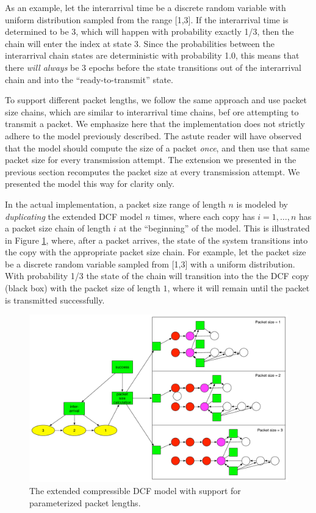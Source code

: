 \documentclass[conference]{IEEEtran}
\begin{document}
As an example, let the interarrival time be a discrete random variable with uniform distribution sampled from the range [1,3]. If the interarrival time is determined to be 3, which will happen with probability exactly 1/3, then the chain will enter the index at state 3. Since the probabilities between the interarrival chain states are deterministic with probability 1.0, this means that there \emph{will always} be 3 epochs before the state transitions out of the interarrival chain and into the ``ready-to-transmit'' state. 

To support different packet lengths, we follow the same approach and use packet size chains, which are similar to interarrival time chains, bef	ore attempting to transmit a packet. We emphasize here that the implementation does not strictly adhere to the model previously described. The astute reader will have observed that the model should compute the size of a packet \emph{once}, and then use that same packet size for every transmission attempt. The extension we presented in the previous section recomputes the packet size at every transmission attempt. We presented the model this way for clarity only. 

In the actual implementation, a packet size range of length $n$ is modeled by \emph{duplicating} the extended DCF model $n$ times, where each copy has $i = 1,\dots,n$ has a packet size chain of length $i$ at the ``beginning'' of the model. This is illustrated in Figure \ref{fig:compressible_dcf_all}, where, after a packet arrives, the state of the system transitions into the copy with the appropriate packet size chain. For example, let the packet size be a discrete random variable sampled from [1,3] with a uniform distribution. With probability 1/3 the state of the chain will transition into the the DCF copy (black box) with the packet size of length $1$, where it will remain until the packet is transmitted successfully. 

\begin{figure}
\begin{center}
\includegraphics[scale=0.2]{../../sketches/compressible_dcf_all.pdf}
\caption{The extended compressible DCF model with support for parameterized packet lengths.}
\label{fig:compressible_dcf_all}
\end{center}
\end{figure}
\end{document}
